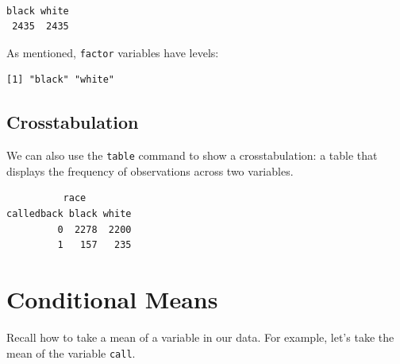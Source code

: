 \documentclass[
  letterpaper,
  DIV=11,
  numbers=noendperiod]{scrreprt}
\newenvironment{Shaded}{\begin{snugshade}}{\end{snugshade}}
\newcommand{\AttributeTok}[1]{\textcolor[rgb]{0.40,0.45,0.13}{#1}}
\newcommand{\DocumentationTok}[1]{\textcolor[rgb]{0.37,0.37,0.37}{\textit{#1}}}
\newcommand{\FunctionTok}[1]{\textcolor[rgb]{0.28,0.35,0.67}{#1}}
\newcommand{\NormalTok}[1]{\textcolor[rgb]{0.00,0.23,0.31}{#1}}
\newcommand{\SpecialCharTok}[1]{\textcolor[rgb]{0.37,0.37,0.37}{#1}}
\begin{document}
\begin{verbatim}

black white 
 2435  2435 
\end{verbatim}

As mentioned, \texttt{factor} variables have levels:

\begin{Shaded}
\end{Shaded}

\begin{verbatim}
[1] "black" "white"
\end{verbatim}

\hypertarget{crosstabulation}{%
\subsection{Crosstabulation}\label{crosstabulation}}

We can also use the \texttt{table} command to show a crosstabulation: a
table that displays the frequency of observations across two variables.

\begin{Shaded}
\end{Shaded}

\begin{verbatim}
          race
calledback black white
         0  2278  2200
         1   157   235
\end{verbatim}

\hypertarget{conditional-means}{%
\section{Conditional Means}\label{conditional-means}}

Recall how to take a mean of a variable in our data. For example, let's
take the mean of the variable \texttt{call}.
\end{document}
